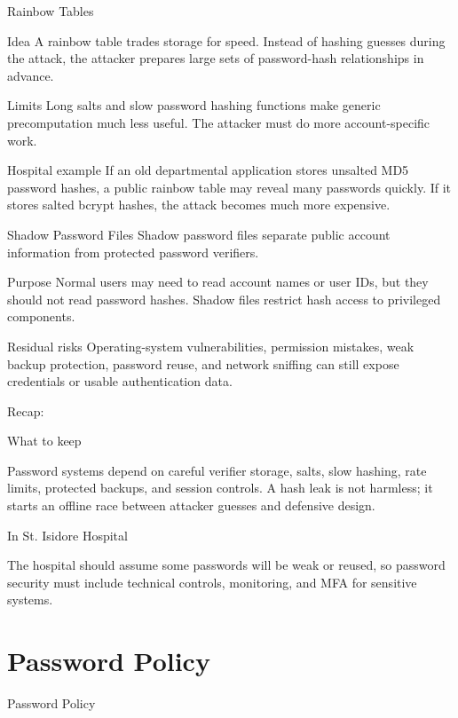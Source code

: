 \documentclass[presentation]{beamer}
\newcommand{\sectiontitleframe}[1]{
\begin{frame}[plain,c]
\begin{center}
{\usebeamerfont{title}\usebeamercolor[fg]{title}#1}
\end{center}
\end{frame}
}
\newcommand{\scenario}{St. Isidore Hospital}
\newcommand{\takeawaysframe}[2]{
  \begin{frame}[c]{Recap: \insertsection}
    \begin{block}{What to keep}
      #1
    \end{block}
    \begin{exampleblock}{In \scenario}
      #2
    \end{exampleblock}
  \end{frame}
}
\begin{document}
\begin{frame}[c]{Rainbow Tables}
  \begin{block}{Idea}
    A rainbow table trades storage for speed. Instead of hashing guesses during the attack, the attacker prepares large sets of password-hash relationships in advance.
  \end{block}

  \begin{block}{Limits}
    Long salts and slow password hashing functions make generic precomputation much less useful. The attacker must do more account-specific work.
  \end{block}

  \begin{exampleblock}{Hospital example}
    If an old departmental application stores unsalted MD5 password hashes, a public rainbow table may reveal many passwords quickly. If it stores salted bcrypt hashes, the attack becomes much more expensive.
  \end{exampleblock}
\end{frame}

\begin{frame}[c]{Shadow Password Files}
  Shadow password files separate public account information from protected password verifiers.

  \begin{block}{Purpose}
    Normal users may need to read account names or user IDs, but they should not read password hashes. Shadow files restrict hash access to privileged components.
  \end{block}

  \begin{block}{Residual risks}
    Operating-system vulnerabilities, permission mistakes, weak backup protection, password reuse, and network sniffing can still expose credentials or usable authentication data.
  \end{block}
\end{frame}

\takeawaysframe{
  Password systems depend on careful verifier storage, salts, slow hashing, rate limits, protected backups, and session controls. A hash leak is not harmless; it starts an offline race between attacker guesses and defensive design.
}{
  The hospital should assume some passwords will be weak or reused, so password security must include technical controls, monitoring, and MFA for sensitive systems.
}

\section{Password Policy}
\sectiontitleframe{Password Policy}
\end{document}
